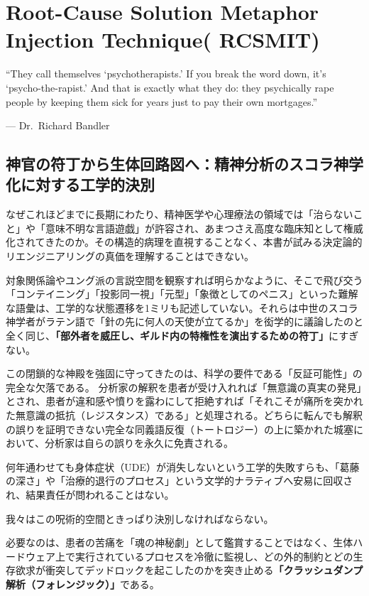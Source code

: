 \chapter{Root-Cause Solution Metaphor Injection Technique\texttrademark ( RCSMIT\texttrademark )}
\epigraph{
``They call themselves `psychotherapists.' If you break the word down, it's `psycho-the-rapist.' And that is exactly what they do: they psychically rape people by keeping them sick for years just to pay their own mortgages.''
}{--- Dr.~Richard Bandler}

\section{神官の符丁から生体回路図へ：精神分析のスコラ神学化に対する工学的決別}

なぜこれほどまでに長期にわたり、精神医学や心理療法の領域では「治らないこと」や「意味不明な言語遊戯」が許容され、あまつさえ高度な臨床知として権威化されてきたのか。その構造的病理を直視することなく、本書が試みる決定論的リエンジニアリングの真価を理解することはできない。

対象関係論やユング派の言説空間を観察すれば明らかなように、そこで飛び交う「コンテイニング」「投影同一視」「元型」「象徴としてのペニス」といった難解な語彙は、工学的な状態遷移を1ミリも記述していない。それらは中世のスコラ神学者がラテン語で「針の先に何人の天使が立てるか」を衒学的に議論したのと全く同じ、\textbf{「部外者を威圧し、ギルド内の特権性を演出するための符丁」}にすぎない。

この閉鎖的な神殿を強固に守ってきたのは、科学の要件である「反証可能性」の完全な欠落である。
分析家の解釈を患者が受け入れれば「無意識の真実の発見」とされ、患者が違和感や憤りを露わにして拒絶すれば「それこそが痛所を突かれた無意識の抵抗（レジスタンス）である」と処理される。どちらに転んでも解釈の誤りを証明できない完全な同義語反復（トートロジー）の上に築かれた城塞において、分析家は自らの誤りを永久に免責される。

何年通わせても身体症状（UDE）が消失しないという工学的失敗すらも、「葛藤の深さ」や「治療的退行のプロセス」という文学的ナラティブへ安易に回収され、結果責任が問われることはない。

我々はこの呪術的空間ときっぱり決別しなければならない。

必要なのは、患者の苦痛を「魂の神秘劇」として鑑賞することではなく、生体ハードウェア上で実行されているプロセスを冷徹に監視し、どの外的制約とどの生存欲求が衝突してデッドロックを起こしたのかを突き止める\textbf{「クラッシュダンプ解析（フォレンジック）」}である。

